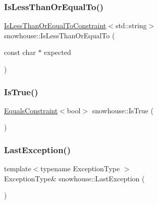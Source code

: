 \mbox{\label{namespacesnowhouse_a1f4f78727bcf2751127320342bf5f305}} 
\subsubsection{\texorpdfstring{IsLessThanOrEqualTo()}{IsLessThanOrEqualTo()}\hspace{0.1cm}{\footnotesize\ttfamily [2/2]}}
{\footnotesize\ttfamily \mbox{\hyperlink{structsnowhouse_1_1IsLessThanOrEqualToConstraint}{Is\+Less\+Than\+Or\+Equal\+To\+Constraint}}$<$std\+::string$>$ snowhouse\+::\+Is\+Less\+Than\+Or\+Equal\+To (\begin{DoxyParamCaption}\item[{const char $\ast$}]{expected }\end{DoxyParamCaption})\hspace{0.3cm}{\ttfamily [inline]}}

\mbox{\label{namespacesnowhouse_a5666021c8516bcb9eb9fd8a026e64ab9}} 
\subsubsection{\texorpdfstring{IsTrue()}{IsTrue()}}
{\footnotesize\ttfamily \mbox{\hyperlink{structsnowhouse_1_1EqualsConstraint}{Equals\+Constraint}}$<$bool$>$ snowhouse\+::\+Is\+True (\begin{DoxyParamCaption}{ }\end{DoxyParamCaption})\hspace{0.3cm}{\ttfamily [inline]}}

\mbox{\label{namespacesnowhouse_a6093862b600733eb0d8124f053433fb6}} 
\subsubsection{\texorpdfstring{LastException()}{LastException()}}
{\footnotesize\ttfamily template$<$typename Exception\+Type $>$ \\
Exception\+Type\& snowhouse\+::\+Last\+Exception (\begin{DoxyParamCaption}{ }\end{DoxyParamCaption})\hspace{0.3cm}{\ttfamily [inline]}}

